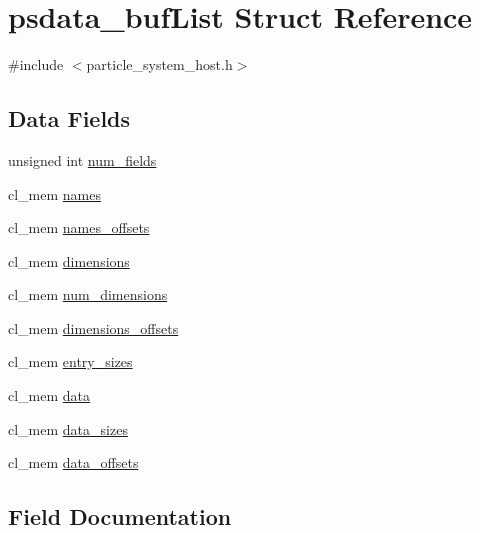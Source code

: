 \hypertarget{structpsdata__bufList}{}\section{psdata\+\_\+buf\+List Struct Reference}
\label{structpsdata__bufList}


{\ttfamily \#include $<$particle\+\_\+system\+\_\+host.\+h$>$}

\subsection*{Data Fields}
\begin{DoxyCompactItemize}
\item 
unsigned int \hyperlink{structpsdata__bufList_a8150194819034d266db259d3469e3093}{num\+\_\+fields}
\item 
cl\+\_\+mem \hyperlink{structpsdata__bufList_a692e26c884416e7b932f2785eb0a9f97}{names}
\item 
cl\+\_\+mem \hyperlink{structpsdata__bufList_a959534753c9b5429408fdb1c99f4479c}{names\+\_\+offsets}
\item 
cl\+\_\+mem \hyperlink{structpsdata__bufList_affc6b6790b65adc5ffd41ffe654477e7}{dimensions}
\item 
cl\+\_\+mem \hyperlink{structpsdata__bufList_ab88f6bd66f625383d9781707d266cd66}{num\+\_\+dimensions}
\item 
cl\+\_\+mem \hyperlink{structpsdata__bufList_af2352e065d080b867a1aea92db81dca8}{dimensions\+\_\+offsets}
\item 
cl\+\_\+mem \hyperlink{structpsdata__bufList_a887652ee87b5f358abf6ad65f37b4800}{entry\+\_\+sizes}
\item 
cl\+\_\+mem \hyperlink{structpsdata__bufList_ab2931ac0677c25cc9885e7dc9964b088}{data}
\item 
cl\+\_\+mem \hyperlink{structpsdata__bufList_af4f580f6a6cdfe8f4894d596c1665578}{data\+\_\+sizes}
\item 
cl\+\_\+mem \hyperlink{structpsdata__bufList_a349d575ccdb00eddbab74a6f0590a90d}{data\+\_\+offsets}
\end{DoxyCompactItemize}


\subsection{Field Documentation}
\hypertarget{structpsdata__bufList_ab2931ac0677c25cc9885e7dc9964b088}{}
